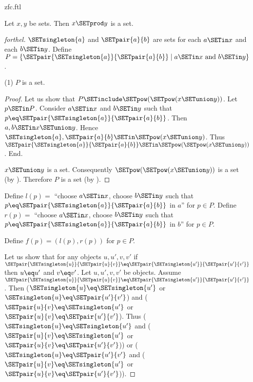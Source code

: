 \documentclass{naproche-library}
\begin{document}
\begin{smodule}[title=ZFC]{zfc.ftl}
\begin{proposition}[forthel,id=FOUNDATIONS_10_4458706448154624]
  Let $x, y$ be sets.
  Then $x \SETprod y$ is a set.
\end{proposition}
\begin{proof}[forthel]
  $\SETsingleton{a}$ and $\SETpair{a}{b}$ are sets for each $a \SETin x$ and each $b \SETin y$.
  Define $P = \{ \SETpair{\SETsingleton{a}}{\SETpair{a}{b}} \mid a \SETin x\text{ and }b \SETin y \}$.

  (1) $P$ is a set.
  \begin{proof}
    Let us show that $P \SETinclude \SETpow(\SETpow(x \SETunion y))$.
      Let $p \SETin P$.
      Consider $a \SETin x$ and $b \SETin y$ such that $p \eq \SETpair{\SETsingleton{a}}{\SETpair{a}{b}}$.
      Then $a, b \SETin x \SETunion y$.
      Hence $\SETsingleton{a}, \SETpair{a}{b} \SETin \SETpow(x \SETunion y)$.
      Thus $\SETpair{\SETsingleton{a}}{\SETpair{a}{b}} \SETin \SETpow(\SETpow(x \SETunion y))$.
    End.

    $x \SETunion y$ is a set.
    Consequently $\SETpow(\SETpow(x \SETunion y))$ is a set (by ).
    Therefore $P$ is a set (by ).
  \end{proof}

  Define $l(p) =$ ``choose $a \SETin x$, choose $b \SETin y$ such that $p \eq \SETpair{\SETsingleton{a}}{\SETpair{a}{b}}$ in $a$'' for $p \in P$.
  Define $r(p) =$ ``choose $a \SETin x$, choose $b \SETin y$ such that $p \eq \SETpair{\SETsingleton{a}}{\SETpair{a}{b}}$ in $b$'' for $p \in P$.

  Define $f(p) = (l(p), r(p))$ for $p \in P$.

  Let us show that for any objects $u, u', v, v'$ if
  $\SETpair{\SETsingleton{u}}{\SETpair{u}{v}} \eq \SETpair{\SETsingleton{u'}}{\SETpair{u'}{v'}}$ then $u \eq u'$ and $v \eq v'$.
    Let $u, u', v, v'$ be objects.
    Assume $\SETpair{\SETsingleton{u}}{\SETpair{u}{v}} \eq \SETpair{\SETsingleton{u'}}{\SETpair{u'}{v'}}$.
    Then ($\SETsingleton{u} \eq \SETsingleton{u'}$ or $\SETsingleton{u} \eq \SETpair{u'}{v'}$) and ($\SETpair{u}{v} \eq \SETsingleton{u'}$ or $\SETpair{u}{v} \eq \SETpair{u'}{v'}$).
    Thus ($\SETsingleton{u} \eq \SETsingleton{u'}$ and ($\SETpair{u}{v} \eq \SETsingleton{u'}$ or $\SETpair{u}{v} \eq \SETpair{u'}{v'}$)) or ($\SETsingleton{u} \eq \SETpair{u'}{v'}$ and ($\SETpair{u}{v} \eq \SETsingleton{u'}$ or $\SETpair{u}{v} \eq \SETpair{u'}{v'}$)).


\end{proof}
\end{smodule}
\end{document}
